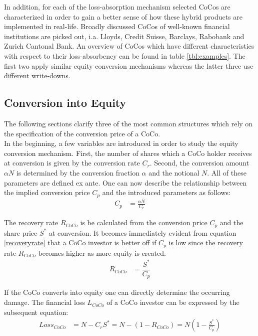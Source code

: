 In addition, for each of the loss-absorption mechanism selected CoCos are characterized in order to gain a better sense of how these hybrid products are implemented in real-life. Broadly discussed CoCos of well-known financial institutions are picked out, i.a. Lloyds, Credit Suisse, Barclays, Rabobank and Zurich Cantonal Bank. An overview of CoCos which have different characteristics with respect to their loss-absorbency can be found in table \ref{tbl:examples}. The first two apply similar equity conversion mechanisms whereas the latter three use different write-downs.

\subsection{Conversion into Equity}
The following sections clarify three of the most common structures which rely on the specification of the conversion price of a CoCo.\\

In the beginning, a few variables are introduced in order to study the equity conversion mechanism. First, the number of shares which a CoCo holder receives at conversion is given by the conversion rate $C_r$. Second, the conversion amount $\alpha N$ is determined by the conversion fraction $\alpha$ and the notional $N$. All of these parameters are defined ex ante. One can now describe the relationship between the implied conversion price $C_p$ and the introduced parameters as follows: \citep{de2014handbook}
\begin{align}
C_p &= \frac{\alpha N}{C_r}
\end{align}

The recovery rate $R_{CoCo}$ is be calculated from the conversion price $C_p$ and the share price $S^*$ at conversion. It becomes immediately evident from equation \ref{recoveryrate} that a CoCo investor is better off if $C_p$ is low since the recovery rate $R_{CoCo}$ becomes higher as more equity is created. 
\begin{align} \label{recoveryrate}
R_{CoCo} &= \dfrac{S^*}{C_p}
\end{align}

If the CoCo converts into equity one can directly determine the occurring damage. The financial loss $L_{CoCo}$ of a CoCo investor can be expressed by the subsequent equation:
\begin{align}
{Loss}_{CoCo} &= N - C_r S^* = N - (1 - R_{CoCo}) = N \left(1 - \frac{S^{*}}{C_p} \right)
\end{align}

